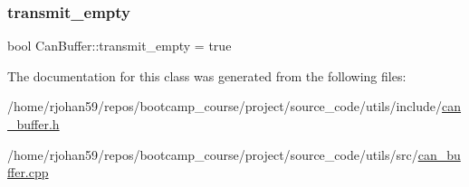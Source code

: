 \mbox{\label{classCanBuffer_a60d0c06e2b6ec133bc3d2b99872dc536}} 
\subsubsection{\texorpdfstring{transmit\+\_\+empty}{transmit\_empty}}
{\footnotesize\ttfamily bool Can\+Buffer\+::transmit\+\_\+empty = true\hspace{0.3cm}{\ttfamily [private]}}



The documentation for this class was generated from the following files\+:\begin{DoxyCompactItemize}
\item 
/home/rjohan59/repos/bootcamp\+\_\+course/project/source\+\_\+code/utils/include/\hyperlink{can__buffer_8h}{can\+\_\+buffer.\+h}\item 
/home/rjohan59/repos/bootcamp\+\_\+course/project/source\+\_\+code/utils/src/\hyperlink{can__buffer_8cpp}{can\+\_\+buffer.\+cpp}\end{DoxyCompactItemize}
